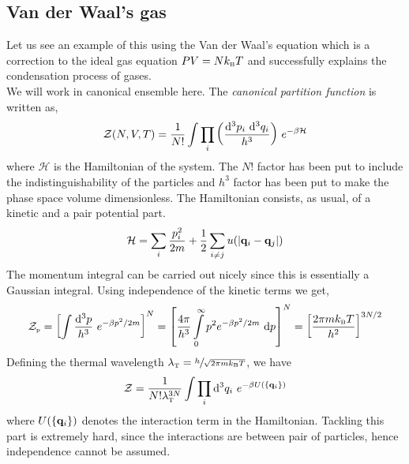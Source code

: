 \subsection{Van der Waal's gas}
Let us see an example of this using the Van der Waal's equation which is a correction to the ideal gas equation $PV = Nk_{\text{\tiny B}} T$ and successfully explains the condensation process of gases.\\[0.2cm]
We will work in canonical ensemble here. The \textit{canonical partition function} is written as,
$$\mathcal{Z}(N,V,T) = \frac{1}{N!}\int \prod\limits_i \qty(\frac{\dd^3 p_i\ \dd^3 q_i}{h^3}) \ e^{-\beta\mathcal{H}}$$
where $\mathcal{H}$ is the Hamiltonian of the system. The $N!$ factor has been put to include the indistinguishability of the particles and $h^3$ factor has been put to make the phase space volume dimensionless. The Hamiltonian consists, as usual, of a kinetic and a pair potential part. 
$$\mathcal{H} = \sum\limits_i \frac{p_i^2}{2m} + \frac{1}{2}\sum\limits_{i\neq j}u(\abs{\vb{q}_i-\vb{q}_j})$$
The momentum integral can be carried out nicely since this is essentially a Gaussian integral. Using independence of the kinetic terms we get,
\begin{align*}
    \mathcal{Z}_{\text{\tiny p}}= \qty[\int \frac{\dd^3 p}{h^3}\ e^{-\beta p^2/2m}]^N=\qty[\frac{4\pi}{h^3}\int\limits_0^\infty p^2 e^{-\beta p^2/2m}\ \dd p]^N  = \qty[\frac{2\pi m k_{\text{\tiny B}} T}{h^2}]^{3N/2}
\end{align*}
Defining the thermal wavelength $\lambda_{\text{\tiny T}} = \sfrac{h}{\sqrt{2\pi m k_{\text{\tiny B}} T}}$, we have 
$$\mathcal Z = \frac{1}{N!\lambda_{\text{\tiny T}}^{3N}}\int \prod\limits_i \dd^3 q_i\ e^{-\beta U(\{\vb{q}_i\})}$$
where $U(\{\vb{q}_i\})$ denotes the interaction term in the Hamiltonian. Tackling this part is extremely hard, since the interactions are between pair of particles, hence independence cannot be assumed.

